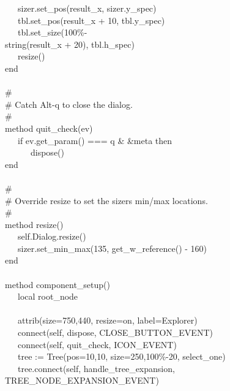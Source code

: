 {\>   \ \ \ sizer.set\_pos(result\_x, sizer.y\_spec) \\
\>   \ \ \ tbl.set\_pos(result\_x + 10, tbl.y\_spec) \\
\>   \ \ \ tbl.set\_size({\textquotedbl}100\%-{\textquotedbl} \\
{\textbar}{\textbar} string(result\_x + 20), tbl.h\_spec) \\
\>   \ \ \ resize() \\
\>   end \\
\ \\
\>   \# \\
\>   \# Catch Alt-q to close the dialog. \\
\>   \# \\
\>   method quit\_check(ev) \\
\>   \ \ \ if ev.get\_param() === {\textquotedbl}q{\textquotedbl} \&
\&meta then \\
\>   \ \ \ \ \ \ dispose() \\
\>   end \\
\ \\
\>   \# \\
\>   \# Override resize to set the sizer{\textquotesingle}s min/max
locations. \\
\>   \# \\
\>   method resize() \\
\>   \ \ \ self.Dialog.resize() \\
\>   \ \ \ sizer.set\_min\_max(135, get\_w\_reference() - 160) \\
\>   end \\
\ \\
\>   method component\_setup() \\
\>   \ \ \ local root\_node \\
\ \\
\>   \ \ \ attrib({\textquotedbl}size=750,440{\textquotedbl},
{\textquotedbl}resize=on{\textquotedbl},
{\textquotedbl}label=Explorer{\textquotedbl}) \\
\>   \ \ \ connect(self, {\textquotedbl}dispose{\textquotedbl},
CLOSE\_BUTTON\_EVENT) \\
\>   \ \ \ connect(self, {\textquotedbl}quit\_check{\textquotedbl},
ICON\_EVENT) \\
\>   \ \ \ tree := Tree({\textquotedbl}pos=10,10{\textquotedbl},
{\textquotedbl}size=250,100\%-20{\textquotedbl},
{\textquotedbl}select\_one{\textquotedbl}) \\
\>   \ \ \ tree.connect(self,
{\textquotedbl}handle\_tree\_expansion{\textquotedbl},
TREE\_NODE\_EXPANSION\_EVENT) \\
}
